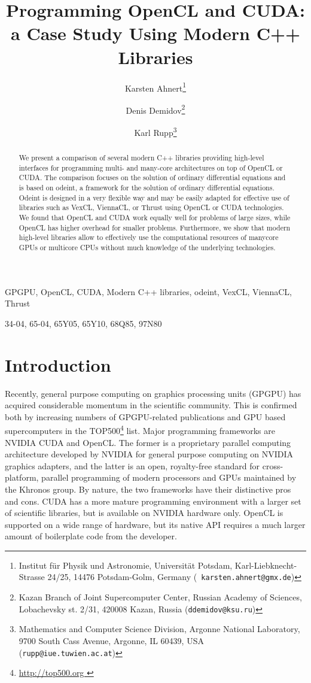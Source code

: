 \documentclass[final]{siamltex}
\title{Programming OpenCL and CUDA:\\a Case Study Using Modern C++ Libraries}
\author{
Karsten Ahnert\thanks{Institut f\"ur Physik und Astronomie, Universit\"at Potsdam,
Karl-Liebknecht-Strasse 24/25, 14476 Potsdam-Golm, Germany ({\tt
karsten.ahnert@gmx.de}) }
\and Denis Demidov\thanks{
Kazan Branch of Joint Supercomputer Center,
Russian Academy of Sciences,
Lobachevsky st. 2/31, 420008 Kazan, Russia
({\tt ddemidov@ksu.ru}) }
\and Karl Rupp\thanks{Mathematics and Computer Science Division,
Argonne National Laboratory,
9700 South Cass Avenue, Argonne, IL 60439, USA
({\tt rupp@iue.tuwien.ac.at}) } }
\begin{document}
\maketitle

\begin{abstract}
    We present a comparison of several modern C++ libraries providing high-level interfaces
    for programming multi- and many-core architectures on top of OpenCL or CUDA.
    The comparison focuses on the solution of ordinary differential equations and is based on odeint,
    a framework for the solution of ordinary differential equations. Odeint is designed in a
    very flexible way and may be easily adapted for effective use of libraries such
    as VexCL, ViennaCL, or Thrust using OpenCL or CUDA technologies.
    We found that OpenCL and CUDA work equally well for problems
    of large sizes, while OpenCL has higher overhead for smaller problems.
    Furthermore, we show that modern high-level libraries allow to effectively
    use the computational resources of manycore GPUs or multicore CPUs without much
    knowledge of the underlying technologies.
\end{abstract}

\begin{keywords}
    GPGPU, OpenCL, CUDA, Modern C++ libraries, odeint, VexCL, ViennaCL, Thrust
\end{keywords}

\begin{AMS}
    34-04, 65-04, 65Y05, 65Y10, 68Q85, 97N80
\end{AMS}


%
%
\section{Introduction}

\pagestyle{myheadings}

\thispagestyle{plain}


Recently, general purpose computing on graphics processing units (GPGPU) has
acquired considerable momentum in the scientific community. This is confirmed
both by increasing numbers of GPGPU-related publications and GPU based
supercomputers in the TOP500\footnote{ \href{ http://top500.org }{
http://top500.org }} list. Major programming frameworks are NVIDIA CUDA and
OpenCL.  The former is a proprietary parallel computing architecture developed
by NVIDIA for general purpose computing on NVIDIA graphics adapters, and the
latter is an open, royalty-free standard for cross-platform, parallel
programming of modern processors and GPUs maintained by the Khronos group. By nature,
the two frameworks have their distinctive pros and cons. CUDA has a more mature
programming environment with a larger set of scientific libraries, but is 
available on NVIDIA hardware only. OpenCL is supported on a wide range of hardware,
but its native API requires a much larger amount of boilerplate code from the
developer.
\end{document}
